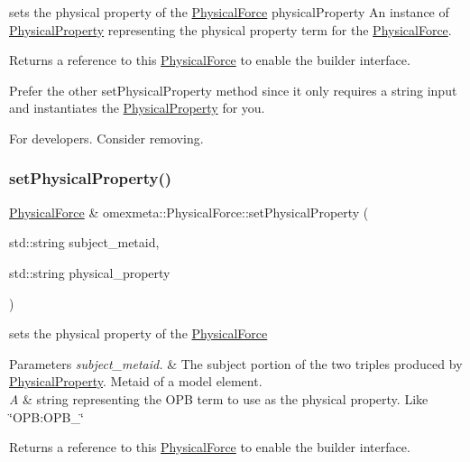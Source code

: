 sets the physical property of the \hyperlink{classomexmeta_1_1PhysicalForce}{Physical\+Force}  physical\+Property An instance of \hyperlink{classomexmeta_1_1PhysicalProperty}{Physical\+Property} representing the physical property term for the \hyperlink{classomexmeta_1_1PhysicalForce}{Physical\+Force}. 

\begin{DoxyReturn}{Returns}
a reference to this \hyperlink{classomexmeta_1_1PhysicalForce}{Physical\+Force} to enable the builder interface.
\end{DoxyReturn}
Prefer the other set\+Physical\+Property method since it only requires a string input and instantiates the \hyperlink{classomexmeta_1_1PhysicalProperty}{Physical\+Property} for you.

For developers. Consider removing. \mbox{\label{classomexmeta_1_1PhysicalForce_a3f979432322d40efc8a15cf5ee883100}} 
\subsubsection{\texorpdfstring{set\+Physical\+Property()}{setPhysicalProperty()}\hspace{0.1cm}{\footnotesize\ttfamily [2/2]}}
{\footnotesize\ttfamily \hyperlink{classomexmeta_1_1PhysicalForce}{Physical\+Force} \& omexmeta\+::\+Physical\+Force\+::set\+Physical\+Property (\begin{DoxyParamCaption}\item[{std\+::string}]{subject\+\_\+metaid,  }\item[{std\+::string}]{physical\+\_\+property }\end{DoxyParamCaption})}



sets the physical property of the \hyperlink{classomexmeta_1_1PhysicalForce}{Physical\+Force} 


\begin{DoxyParams}{Parameters}
{\em subject\+\_\+metaid.} & The subject portion of the two triples produced by \hyperlink{classomexmeta_1_1PhysicalProperty}{Physical\+Property}. Metaid of a model element. \\
\hline
{\em A} & string representing the O\+PB term to use as the physical property. Like \char`\"{}\+O\+P\+B\+:\+O\+P\+B\+\_\char`\"{} \\
\hline
\end{DoxyParams}
\begin{DoxyReturn}{Returns}
a reference to this \hyperlink{classomexmeta_1_1PhysicalForce}{Physical\+Force} to enable the builder interface. 
\end{DoxyReturn}
\mbox{\label{classomexmeta_1_1PhysicalForce_a39dd511aee85130d07cb6ffb3f8e87f0}} 
